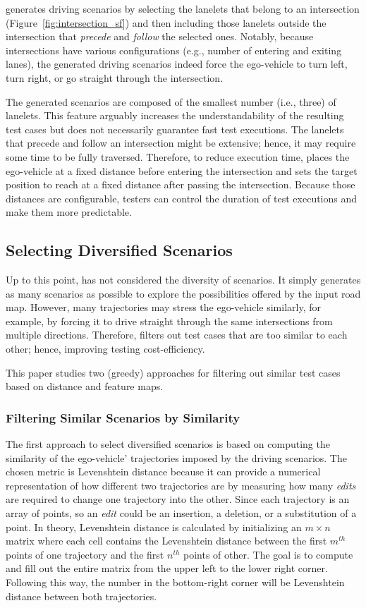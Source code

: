 \documentclass[conference]{IEEEtran}
\begin{document}
\tool generates driving scenarios by selecting the lanelets that belong to an intersection (Figure~\ref{fig:intersection_sf}) and then including those lanelets outside the intersection that \emph{precede} and \emph{follow} the selected ones. Notably, because intersections have various configurations (e.g., number of entering and exiting lanes), the generated driving scenarios indeed force the ego-vehicle to turn left, turn right, or go straight through the intersection.

The generated scenarios are composed of the smallest number (i.e., three) of lanelets. This feature arguably increases the understandability of the resulting test cases but does not necessarily guarantee fast test executions. The lanelets that precede and follow an intersection might be extensive; hence, it may require some time to be fully traversed. Therefore, to reduce execution time, \tool places the ego-vehicle at a fixed distance before entering the intersection and sets the target position to reach at a fixed distance after passing the intersection. Because those distances are configurable, testers can control the duration of test executions and make them more predictable.


\subsection{Selecting Diversified Scenarios}
Up to this point, \tool has not considered the diversity of scenarios. It simply generates as many scenarios as possible to explore the possibilities offered by the input road map. However, many trajectories may stress the ego-vehicle similarly, for example, by forcing it to drive straight through the same intersections from multiple directions. Therefore, \tool filters out test cases that are too similar to each other; hence, improving testing cost-efficiency.

This paper studies two (greedy) approaches for filtering out similar test cases based on distance and feature maps.

\subsubsection{Filtering Similar Scenarios by Similarity}
The first approach to select diversified scenarios is based on computing the similarity of the ego-vehicle' trajectories imposed by the driving scenarios. The chosen metric is Levenshtein distance because it can provide a numerical representation of how different two trajectories are by measuring how many \emph{edits} are required to change one trajectory into the other. Since each trajectory is an array of points, so an \emph{edit} could be an insertion, a deletion, or a substitution of a point. In theory, Levenshtein distance is calculated by initializing an  $m\times n$ matrix where each cell contains the Levenshtein distance between the first $m^{th}$ points of one trajectory and the first $n^{th}$ points of other. The goal is to compute and fill out the entire matrix from the upper left to the lower right corner. Following this way, the number in the bottom-right corner will be Levenshtein distance between both trajectories.
%
\end{document}

